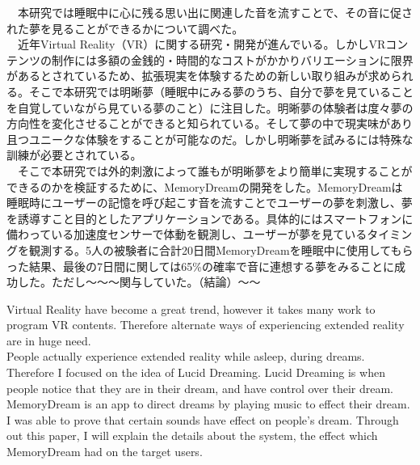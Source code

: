 
\begin{jabstract}
　本研究では睡眠中に心に残る思い出に関連した音を流すことで、その音に促された夢を見ることができるかについて調べた。\\
　近年Virtual Reality（VR）に関する研究・開発が進んでいる。しかしVRコンテンツの制作には多額の金銭的・時間的なコストがかかりバリエーションに限界があるとされているため、拡張現実を体験するための新しい取り組みが求められる。そこで本研究では明晰夢（睡眠中にみる夢のうち、自分で夢を見ていることを自覚していながら見ている夢のこと）に注目した。明晰夢の体験者は度々夢の方向性を変化させることができると知られている。そして夢の中で現実味があり且つユニークな体験をすることが可能なのだ。しかし明晰夢を試みるには特殊な訓練が必要とされている。\\
　そこで本研究では外的刺激によって誰もが明晰夢をより簡単に実現することができるのかを検証するために、MemoryDreamの開発をした。MemoryDreamは睡眠時にユーザーの記憶を呼び起こす音を流すことでユーザーの夢を刺激し、夢を誘導すこと目的としたアプリケーションである。具体的にはスマートフォンに備わっている加速度センサーで体動を観測し、ユーザーが夢を見ているタイミングを観測する。5人の被験者に合計20日間MemoryDreamを睡眠中に使用してもらった結果、最後の7日間に関しては65\%の確率で音に連想する夢をみることに成功した。ただし〜〜〜関与していた。（結論）〜〜
\end{jabstract}

\begin{eabstract}
	Virtual Reality have become a great trend, however it takes many work to program VR contents. Therefore alternate ways of experiencing extended reality are in huge need. \\
 	People actually experience extended reality while asleep, during dreams. Therefore I focused on the idea of Lucid Dreaming. Lucid Dreaming is when people notice that they are in their dream, and have control over their dream.\\
 	MemoryDream is an app to direct dreams by playing music to effect their dream. I was able to prove that certain sounds have effect on people's dream. Through out this paper, I will explain the details about the system, the effect which MemoryDream had on the target users.
\end{eabstract}